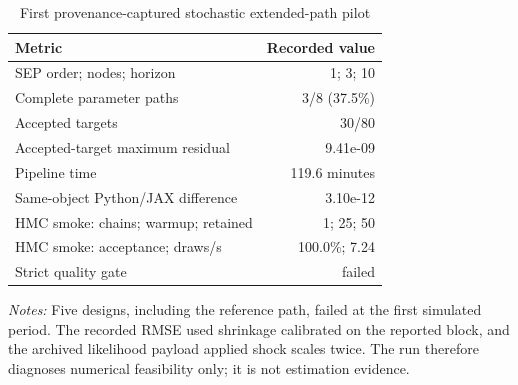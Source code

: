 \begin{table}[t]
\centering
\caption{First provenance-captured stochastic extended-path pilot}
\label{tab:stochastic-pilot}
\begin{tabular}{lr}
\toprule
Metric & Recorded value \\
\midrule
SEP order; nodes; horizon & 1; 3; 10 \\
Complete parameter paths & 3/8 (37.5\%) \\
Accepted targets & 30/80 \\
Accepted-target maximum residual & 9.41e-09 \\
Pipeline time & 119.6 minutes \\
Same-object Python/JAX difference & 3.10e-12 \\
HMC smoke: chains; warmup; retained & 1; 25; 50 \\
HMC smoke: acceptance; draws/s & 100.0\%; 7.24 \\
Strict quality gate & failed \\
\bottomrule
\end{tabular}
\begin{minipage}{0.94\linewidth}
\footnotesize \emph{Notes:} Five designs, including the reference path, failed at the first simulated period. The recorded RMSE used shrinkage calibrated on the reported block, and the archived likelihood payload applied shock scales twice. The run therefore diagnoses numerical feasibility only; it is not estimation evidence.
\end{minipage}
\end{table}
